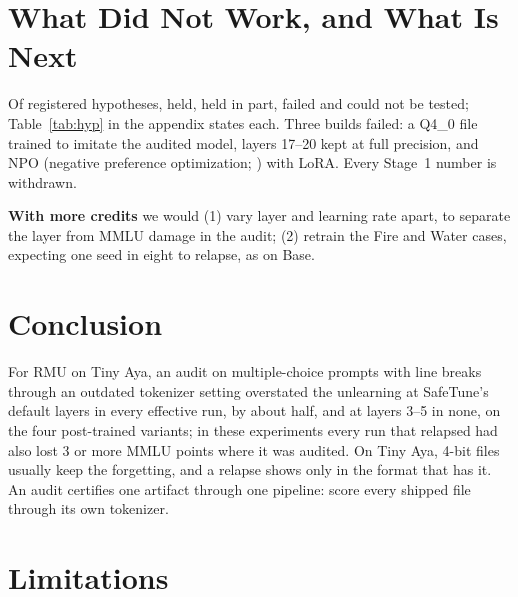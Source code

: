 \documentclass[11pt]{article}
\newcommand{\fq}{\textsc{Q4\_0}}
\begin{document}
\section{What Did Not Work, and What Is Next}
\label{sec:fail}

Of \hypN{} registered hypotheses, \hypHeld{} held, \hypPart{} held in part, \hypFailed{} failed and \hypUntestable{} could not be tested; Table~\ref{tab:hyp} in the appendix states each. Three builds failed: a \fq{} file trained to imitate the audited model, layers 17--20 kept at full precision, and NPO (negative preference optimization; \citealp{zhang2024npo}) with LoRA. Every Stage~1 number is withdrawn.

\noindent{}\par\smallskip

\textbf{With more credits} we would (1) vary layer and learning rate apart, to separate the layer from MMLU damage in the audit; (2) retrain the Fire and Water cases, expecting one seed in eight to relapse, as on Base.

\section{Conclusion}

For RMU on Tiny Aya, an audit on multiple-choice prompts with line breaks through an outdated tokenizer setting overstated the unlearning at SafeTune's default layers in every effective run, by about half, and at layers 3--5 in none, on the four post-trained variants; in these experiments every run that relapsed had also lost 3 or more MMLU points where it was audited. On Tiny Aya, 4-bit files usually keep the forgetting, and a relapse shows only in the format that has it. An audit certifies one artifact through one pipeline: score every shipped file through its own tokenizer.

\section*{Limitations}
\end{document}

